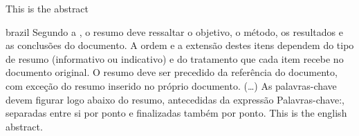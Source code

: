 \setlength{\absparsep}{18pt} %
\begin{resumo}
This is the abstract

\end{resumo}

\begin{resumo}[Resumo]
 \begin{otherlanguage*}{brazil}
  Segundo a \cite[3.1-3.2]{NBR6028:2003}, o resumo deve ressaltar o
  objetivo, o método, os resultados e as conclusões do documento. A ordem e a extensão
  destes itens dependem do tipo de resumo (informativo ou indicativo) e do
  tratamento que cada item recebe no documento original. O resumo deve ser
  precedido da referência do documento, com exceção do resumo inserido no
  próprio documento. (\ldots) As palavras-chave devem figurar logo abaixo do
  resumo, antecedidas da expressão Palavras-chave:, separadas entre si por
  ponto e finalizadas também por ponto.
   This is the english abstract.

   \vspace{\onelineskip}
 
   \noindent 
 \end{otherlanguage*}
\end{resumo}


